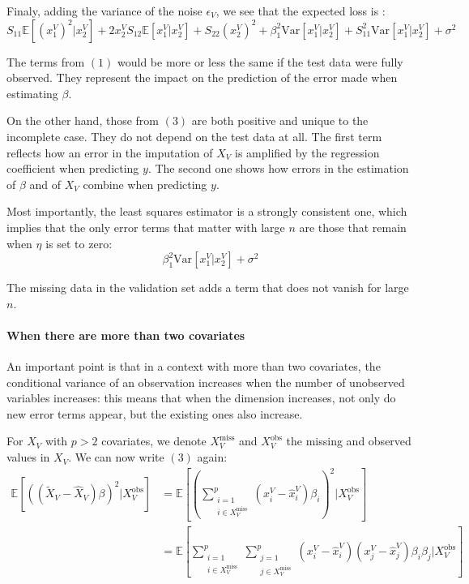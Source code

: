\documentclass[12pt, a4paper]{memoir}
\begin{document}
Finaly, adding the variance of the noise $\epsilon_V$, we see that the expected loss is :
$$
S_{11} \mathbb{E}[(x^V_1)^2 \vert x^V_2]  + 2x^V_2 S_{12} \mathbb{E}[x^V_1 \vert x^V_2] + S_{22} (x^V_2)^2 + 
\beta_1^2 \text{Var}[x^V_1 \vert x^V_2] + S_{11}^2 \text{Var}[x^V_1 \vert x^V_2]  +
\sigma^2
$$

The terms from $(1)$ would be more or less the same if the test data were fully observed. They represent the impact on the prediction of the error made when estimating $\beta$.

 On the other hand, those from $(3)$ are both positive and unique to the incomplete case. They do not depend on the  test data at all. The first term reflects how an error in the imputation of $X_V$ is amplified by the regression coefficient when predicting $y$. The second one shows how errors in the estimation of $\beta$ and of $X_V$ combine when predicting $y$.
 
 Most importantly, the least squares estimator is a strongly consistent one\cite{consistency_linreg}, which implies that the only error terms that matter with large $n$ are those that remain when $\eta$ is set to zero:
 $$ \beta_1^2 \text{Var}[x^V_1 \vert x^V_2] + \sigma^2 $$
 
 The missing data in the validation set adds a term that does not vanish for large $n$.
 
 \paragraph*{When there are more than two covariates}
 An important point is that in a context with more than two covariates, the conditional variance of an observation increases when the number of unobserved variables increases: this means that when the dimension increases, not only do new error terms appear, but the existing ones also increase.
 
 For $X_V$ with $p>2$ covariates, we denote $X_V^{\text{miss}}$ and $X_V^{\text{obs}}$ the missing and observed values in $X_V$. We can now write $(3)$ again:
 \begin{align*}
 \mathbb{E}[((\tilde{X}_V - \hat{X}_V)\beta)^2 \vert X_V^{\text{obs}}] &= 
 		\mathbb{E}[ (\sum \limits_{\substack{i=1 \\i \in X_V^{\text{miss}}}}^{p} (x_i^V - \hat{x}_i^V)\beta_i)^2 \vert X_V^{\text{obs}}] \\
 		&= \mathbb{E}[\sum \limits_{\substack{i=1 \\i \in X_V^{\text{miss}}}}^{p} \sum \limits_{\substack{j=1 \\j \in X_V^{\text{miss}}}}^{p}
 			(x^V_i - \hat{x}^V_i)(x^V_j - \hat{x}^V_j)\beta_i \beta_j \vert X_V^{\text{obs}}]
 \end{align*}
 
\end{document}
